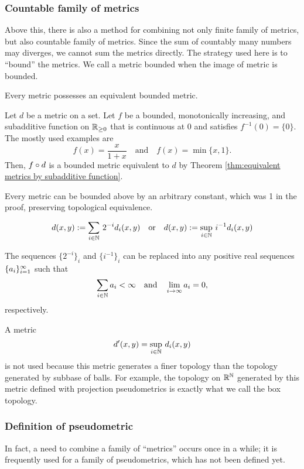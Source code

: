 \documentclass{../crs}
\begin{document}
\subsubsection{Countable family of metrics}
Above this, there is also a method for combining not only finite family of metrics, but also countable family of metrics.
Since the sum of countably many numbers may diverges, we cannot sum the metrics directly.
The strategy used here is to ``bound'' the metrics.
We call a metric bounded when the image of metric is bounded.

\begin{prop}
Every metric possesses an equivalent bounded metric.
\end{prop}
\begin{pf}
Let $d$ be a metric on a set.
Let $f$ be a bounded, monotonically increasing, and subadditive function on $\mathbb{R}_{\ge0}$ that is continuous at 0 and satisfies $f^{-1}(0)=\{0\}$.
The mostly used examples are
\[f(x)=\frac x{1+x}\quad\text{and}\quad f(x)=\min\{x,1\}.\]
Then, $f\circ d$ is a bounded metric equivalent to $d$ by Theorem \ref{thm:equivalent metrics by subadditive function}.
\end{pf}

Every metric can be bounded above by an arbitrary constant, which was 1 in the proof, preserving topological equivalence.


\[d(x,y):=\sum_{i\in\mathbb{N}}\,2^{-i}d_i(x,y)\quad\text{or}\quad d(x,y):=\sup_{i\in\mathbb{N}}\,i^{-1}d_i(x,y)\]

The sequences $\{2^{-i}\}_i$ and $\{i^{-1}\}_i$ can be replaced into any positive real sequences $\{a_i\}_{i=1}^\infty$ such that
\[\sum_{i\in\N}a_i<\oo\quad\text{and}\quad\lim_{i\to\oo}a_i=0,\]
respectively.
\begin{rmk}
A metric
\[d'(x,y)=\sup_{i\in\mathbb{N}}\,d_i(x,y)\]
is not used because this metric generates a finer topology than the topology generated by subbase of balls.
For example, the topology on $\mathbb{R}^{\mathbb{N}}$ generated by this metric defined with projection pseudometrics is exactly what we call the box topology.
\end{rmk}




\subsubsection{Definition of pseudometric}
In fact, a need to combine a family of ``metrics'' occurs once in a while; it is frequently used for a family of pseudometrics, which has not been defined yet.
\end{document}
